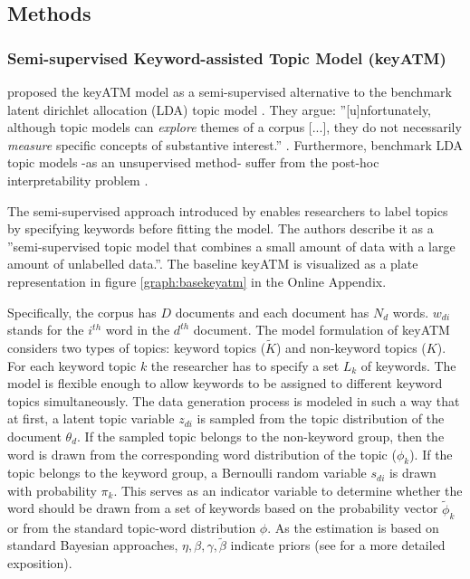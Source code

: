 
\subsection{Methods}\label{subsec:methods}

\subsubsection{Semi-supervised Keyword-assisted Topic Model (\textsf{\textbf{keyATM}})}

\cite{Eshima.2023} proposed the \textsf{keyATM} model as a semi-supervised alternative to the benchmark latent dirichlet allocation (LDA) topic model \citep{blei.2003}. They argue: ''[u]nfortunately, although topic models can \textit{explore} themes of a corpus [...], they do not necessarily \textit{measure} specific concepts of substantive interest.'' \citep[1]{Eshima.2023}. Furthermore, benchmark LDA topic models -as an unsupervised method- suffer from the post-hoc interpretability problem \citep{BoydGraber.etal.2014}.

The semi-supervised approach introduced by \cite{Eshima.2023} enables researchers to label topics by specifying keywords before fitting the model. The authors describe it as a ''semi-supervised topic model that combines a small amount of data with a large amount of unlabelled data.''\citep[2]{Eshima.2023}. The baseline \textsf{keyATM} is visualized as a plate representation in figure \ref{graph:basekeyatm} in the Online Appendix. %

Specifically, the corpus has $D$ documents and each document has $N_d$ words. $w_{di}$ stands for the $i^{th}$ word in the $d^{th}$ document. The model formulation of \textsf{keyATM} considers two types of topics: keyword topics ($\tilde{K}$) and non-keyword topics ($K$). For each keyword topic $k$ the researcher has to specify a set $L_k$ of keywords. The model is flexible enough to allow keywords to be assigned to different keyword topics simultaneously. The data generation process is modeled in such a way that at first, a latent topic variable $z_{di}$ is sampled from the topic distribution of the document $\theta_d$. If the sampled topic belongs to the non-keyword group, then the word is drawn from the corresponding word distribution of the topic ($\phi_k$). If the topic belongs to the keyword group, a Bernoulli random variable $s_{di}$ is drawn with probability $\pi_k$. This serves as an indicator variable to determine whether the word should be drawn from a set of keywords based on the probability vector $\tilde{\phi}_{k}$ or from the standard topic-word distribution $\phi$. As the estimation is based on standard Bayesian approaches, $\eta, \beta, \gamma, \tilde{\beta}$ indicate priors (see \citet[4 f.]{Eshima.2023} for a more detailed exposition).


